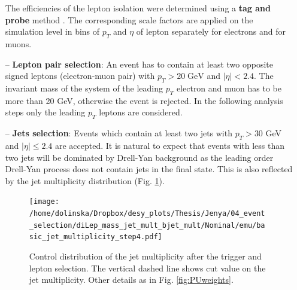 \begin{itemize}
 The efficiencies of the lepton isolation were determined using a \textbf{tag and probe} method \cite{TWikiTP}. The corresponding scale factors are applied on the
 simulation level in bins of $p_{T}$ and $\eta$ of lepton separately for electrons and for muons.
 \item [--] \textbf{Lepton pair selection}: An event has to contain at least two opposite signed leptons (electron-muon pair) with $p_{T} > 20 \; \textrm{GeV}$ and $|\eta| < 2.4$.
 The invariant mass of the system of the leading $p_{T}$ electron and muon has to be more than 20 GeV, otherwise the event is rejected. In the following analysis steps
 only the leading $p_{T}$ leptons are considered.
 \item [--] \textbf{Jets selection}: Events which contain at least two jets with $p_{T} > 30$ GeV and $|\eta| \leq 2.4$ are accepted. It is natural to expect
 that events with less than two jets will be dominated by Drell-Yan background as the leading order Drell-Yan process does not contain jets in the final state. This is also 
 reflected by the jet multiplicity distribution (Fig. \ref{fig:jetMultiSel}). 
 
 \begin{figure}[h]
  \centering
  \texttt{[image: /home/dolinska/Dropbox/desy\_plots/Thesis/Jenya/04\_event\_selection/diLep\_mass\_jet\_mult\_bjet\_mult/Nominal/emu/basic\_jet\_multiplicity\_step4.pdf]}
  \caption{Control distribution of the jet multiplicity after the trigger and lepton selection. The vertical dashed line shows cut value on the 
  jet multiplicity. Other details as in Fig. \ref{fig:PUweights}.}
  \label{fig:jetMultiSel}
 \end{figure}
 

\end{itemize}
